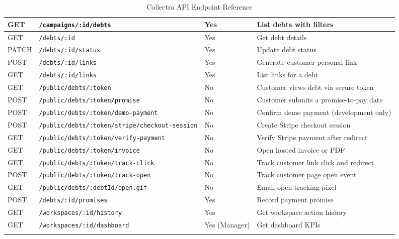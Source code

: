 \documentclass[12pt,a4paper]{report}
\begin{document}
\begin{longtable}{|p{1.4cm}|p{5.8cm}|p{2.8cm}|p{3.8cm}|}
  \hline
  GET   & \texttt{/campaigns/:id/debts}              & Yes            & List debts with filters \\
  \hline
  GET   & \texttt{/debts/:id}                        & Yes            & Get debt details \\
  \hline
  PATCH & \texttt{/debts/:id/status}                 & Yes            & Update debt status \\
  \hline
  POST  & \texttt{/debts/:id/links}                  & Yes            & Generate customer personal link \\
  \hline
  GET   & \texttt{/debts/:id/links}                  & Yes            & List links for a debt \\
  \hline
  GET   & \texttt{/public/debts/:token}              & No             & Customer views debt via secure token \\
  \hline
  POST  & \texttt{/public/debts/:token/promise}      & No             & Customer submits a promise-to-pay date \\
  \hline
  POST  & \texttt{/public/debts/:token/demo-payment}\footnotemark & No & Confirm demo payment (development only) \\
  \hline
  POST  & \texttt{/public/debts/:token/stripe/checkout-session} & No & Create Stripe checkout session \\
  \hline
  GET   & \texttt{/public/debts/:token/verify-payment} & No           & Verify Stripe payment after redirect \\
  \hline
  GET   & \texttt{/public/debts/:token/invoice}      & No             & Open hosted invoice or PDF \\
  \hline
  GET   & \texttt{/public/debts/:token/track-click}  & No             & Track customer link click and redirect \\
  \hline
  POST  & \texttt{/public/debts/:token/track-open}   & No             & Track customer page open event \\
  \hline
  GET   & \texttt{/public/debts/:debtId/open.gif}    & No             & Email open tracking pixel \\
  \hline
  POST  & \texttt{/debts/:id/promises}               & Yes            & Record payment promise \\
  \hline
  GET   & \texttt{/workspaces/:id/history}           & Yes            & Get workspace action history \\
  \hline
  GET   & \texttt{/workspaces/:id/dashboard}         & Yes (Manager)  & Get dashboard KPIs \\
  \hline
  \caption{Collectra API Endpoint Reference}
  \label{tab:api-endpoints}
\end{longtable}
\spewnotes
{}
\end{document}

